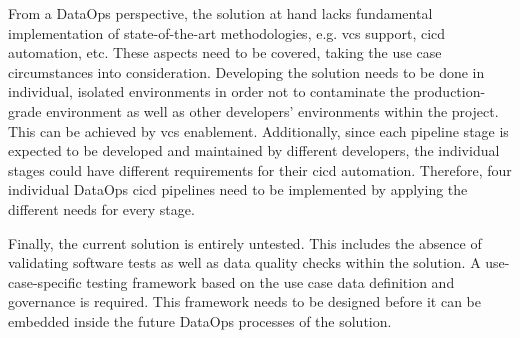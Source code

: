 From a DataOps perspective, the solution at hand lacks fundamental implementation of state-of-the-art methodologies, e.g. \ac{vcs} support, \ac{cicd} automation, etc. These aspects need to be covered, taking the use case circumstances into consideration. Developing the solution needs to be done in individual, isolated environments in order not to contaminate the production-grade environment as well as other developers' environments within the project. This can be achieved by \ac{vcs} enablement. Additionally, since each pipeline stage is expected to be developed and maintained by different developers, the individual stages could have different requirements for their \ac{cicd} automation. Therefore, four individual DataOps \ac{cicd} pipelines need to be implemented by applying the different needs for every stage.

Finally, the current solution is entirely untested. This includes the absence of validating software tests as well as data quality checks within the solution. A use-case-specific testing framework based on the use case data definition and governance is required. This framework needs to be designed before it can be embedded inside the future DataOps processes of the solution.